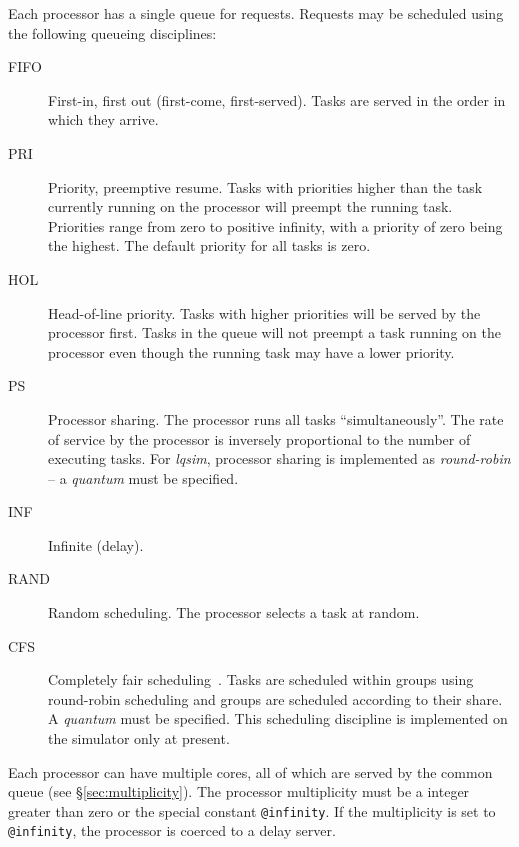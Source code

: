 Each processor has a single queue for requests.  Requests may be
scheduled using the following queueing disciplines:
\begin{description}
\item[FIFO] First-in, first out (first-come,
  first-served).  Tasks are served in the order in which they arrive.
\item[PRI] Priority, preemptive resume.  Tasks with
  priorities higher than the task currently running on
  the processor will preempt the running task.  Priorities range from zero to
  positive infinity, with a priority of zero being the highest.  The default priority for all tasks is zero.
\item[HOL] Head-of-line priority.  Tasks
  with higher priorities will be served by the processor first.  Tasks
  in the queue will not preempt a task running on the processor even
  though the running task may have a lower priority.
\item[PS] Processor sharing.  The processor
  runs all tasks ``simultaneously''.  The rate of service by the
  processor is inversely proportional to the number of executing
  tasks.  For \emph{lqsim}, processor
  sharing is implemented as
  \emph{round-robin}
  -- a \emph{quantum} must be specified.
\item[INF] Infinite (delay). 
\item[RAND] Random scheduling.  The processor selects a task at random. 
\item[CFS] Completely fair scheduling~\cite{perf:li-2009-mascots-fairshare}.  Tasks are scheduled within groups using
  round-robin scheduling and groups are scheduled according to their share.  A
  \emph{quantum} must be specified.  This scheduling discipline is implemented on the
  simulator only at present.
\end{description}

Each processor can have multiple cores, all of which are served by the common queue (see
\S\protect\ref{sec:multiplicity}).  The processor
multiplicity must be a integer greater than zero
or the special constant
\texttt{@infinity}.  If
the multiplicity is set to \texttt{@infinity}, the processor is coerced to a delay
server.  

